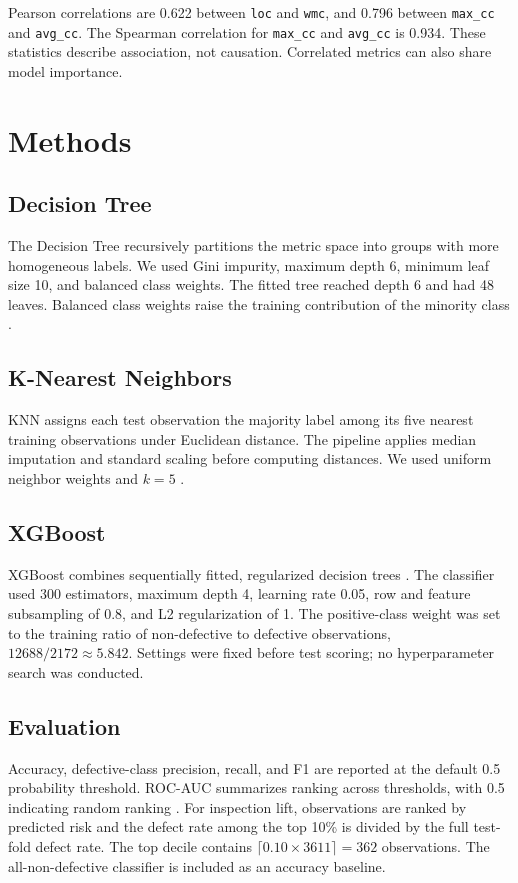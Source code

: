 \documentclass[conference]{IEEEtran}
\begin{document}
Pearson correlations are 0.622 between \texttt{loc} and \texttt{wmc}, and 0.796 between \texttt{max\_cc} and \texttt{avg\_cc}. The Spearman correlation for \texttt{max\_cc} and \texttt{avg\_cc} is 0.934. These statistics describe association, not causation. Correlated metrics can also share model importance.

\section{Methods}
\subsection{Decision Tree}
The Decision Tree recursively partitions the metric space into groups with more homogeneous labels. We used Gini impurity, maximum depth 6, minimum leaf size 10, and balanced class weights. The fitted tree reached depth 6 and had 48 leaves. Balanced class weights raise the training contribution of the minority class \cite{sklearn_tree}.

\subsection{K-Nearest Neighbors}
KNN assigns each test observation the majority label among its five nearest training observations under Euclidean distance. The pipeline applies median imputation and standard scaling before computing distances. We used uniform neighbor weights and $k=5$ \cite{sklearn_knn}.

\subsection{XGBoost}
XGBoost combines sequentially fitted, regularized decision trees \cite{xgboost}. The classifier used 300 estimators, maximum depth 4, learning rate 0.05, row and feature subsampling of 0.8, and L2 regularization of 1. The positive-class weight was set to the training ratio of non-defective to defective observations, $12688/2172 \approx 5.842$. Settings were fixed before test scoring; no hyperparameter search was conducted.

\subsection{Evaluation}
Accuracy, defective-class precision, recall, and F1 are reported at the default 0.5 probability threshold. ROC-AUC summarizes ranking across thresholds, with 0.5 indicating random ranking \cite{fawcett}. For inspection lift, observations are ranked by predicted risk and the defect rate among the top 10\% is divided by the full test-fold defect rate. The top decile contains $\lceil0.10\times3611\rceil=362$ observations. The all-non-defective classifier is included as an accuracy baseline.
\end{document}
